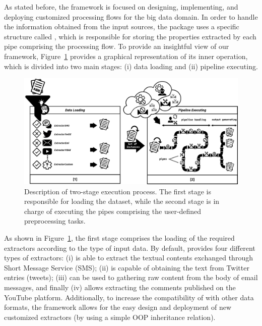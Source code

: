 As stated before, the  framework is focused on designing, implementing, and deploying customized processing flows for the big data domain. In order to handle the information obtained from the input sources, the package uses a specific structure called , which is responsible for storing the properties extracted by each pipe comprising the processing flow. To provide an insightful view of our  framework, Figure~\ref{Figure1} provides a graphical representation of its inner operation, which is divided into two main stages: (i) data loading and (ii) pipeline executing.

\begin{figure}[H]
  \centering
  \includegraphics[width=\textwidth]{Figures/Figure1.pdf}
  \caption{Description of  two-stage execution process. The first stage is responsible for loading the dataset, while the second stage is in charge of executing the pipes comprising the user-defined preprocessing tasks.}
  \label{Figure1}
\end{figure}

As shown in Figure~\ref{Figure1}, the first stage comprises the loading of the required extractors according to the type of input data. By default,  provides four different types of extractors: (i)  is able to extract the textual contents exchanged through Short Message Service (SMS); (ii)  is capable of obtaining the text from Twitter entries (tweets); (iii)  can be used to gathering raw content from the body of email messages, and finally (iv)  allows extracting the comments published on the YouTube platform. Additionally, to increase the compatibility of  with other data formats, the framework allows for the easy design and deployment of new customized extractors (by using a simple OOP inheritance relation).

